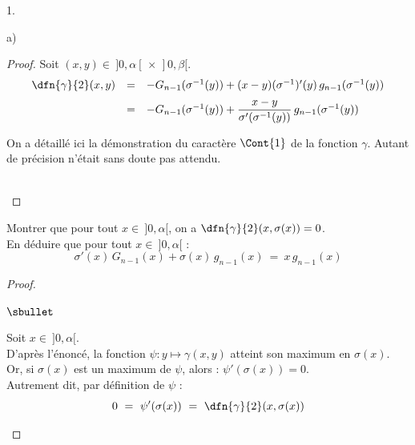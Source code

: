 \begin{noliste}{1.}
\begin{noliste}{a)}
\begin{proof}
      Soit $(x,y) \in \ ]0,\alpha[ \, \times \, ]0,\beta[$.
      \[
       \begin{array}{rcl}
        \dfn{\gamma}{2}(x,y) & = & - G_{n-1}(\sigma^{-1}(y)) +
        (x-y) (\sigma^{-1})'(y) \, g_{n-1}(\sigma^{-1}(y))
        \\[.2cm]
        & = & - G_{n-1}(\sigma^{-1}(y)) + \dfrac{x-y}{\sigma'(\sigma^{-1}
        (y))} \, g_{n-1}(\sigma^{-1}(y))
       \end{array}
      \]
      \conc{$\forall (x,y) \in \ ]0,\alpha[ \, \times \, ]0,\beta[$,
      $\dfn{\gamma}{2}(x,y) \ = \ - G_{n-1}(\sigma^{-1}(y)) + 
      \dfrac{x-y}{\sigma'(\sigma^{-1}
      (y))} \, g_{n-1}(\sigma^{-1}(y))$}
      
      \begin{remark}
        On a détaillé ici la démonstration du caractère $\Cont{1}$
        de la fonction $\gamma$. Autant de précision n'était 
        sans doute pas attendu.
      \end{remark}~\\[-1.4cm]
    \end{proof}

    \item Montrer que pour tout $x \in \ ]0, \alpha[$, on a 
    $\dfn{\gamma}{2}(x, \sigma(x))=0$.\\
    En déduire que pour tout $x \in \ ]0, \alpha[$ : 
    \[
      \sigma'(x) \, G_{n-1}(x) + \sigma(x) \, g_{n-1}(x) \ = \
      x \, g_{n-1}(x)
    \]
    
    \begin{proof}~
      \begin{noliste}{$\sbullet$}
	\item Soit $x \in \ ]0,\alpha[$.\\
	D'après l'énoncé, la fonction $\psi : y \mapsto 
	\gamma(x,y)$ atteint son maximum en $\sigma(x)$.\\
	Or, si $\sigma(x)$ est un maximum de $\psi$, alors : 
	$\psi'(\sigma(x))=0$.\\
	Autrement dit, par définition de $\psi$ :
	\[
	  0 \ = \ \psi'(\sigma(x)) \ = \ \dfn{\gamma}{2}(x, \sigma(x))
	\]
	\conc{$\forall x \in \ ]0,\alpha[$, $\dfn{\gamma}{2}(x,
	\sigma(x)) = 0$}
	
	
	\newpage
	

\end{noliste}
\end{proof}
\end{noliste}
\end{noliste}
